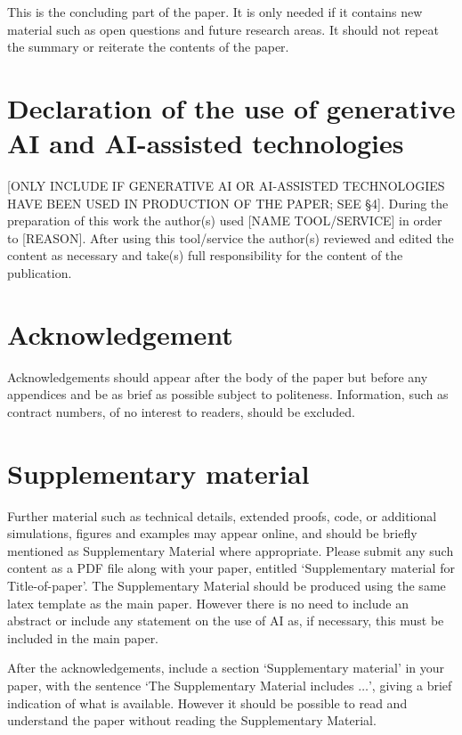 \documentclass[lineno]{biometrika}
\begin{document}
This is the concluding part of the paper.  It is only needed if it contains new material such as open questions and future research areas.
It  should not repeat the summary or reiterate the contents of the paper.


\section*{Declaration of the use of generative AI and AI-assisted technologies}

[ONLY INCLUDE IF GENERATIVE AI OR AI-ASSISTED TECHNOLOGIES HAVE BEEN USED IN PRODUCTION OF THE PAPER; SEE \S 4]. During the preparation of this work the author(s) used [NAME TOOL/SERVICE] in order to [REASON]. After using this tool/service the author(s) reviewed and edited the content as necessary and take(s) full responsibility for the content of the publication.


\section*{Acknowledgement}
Acknowledgements should appear after the body of the paper but before any appendices and be as brief as possible
subject to politeness. Information, such as contract numbers, of no interest to readers, should
be excluded.

\section*{Supplementary material}
\label{SM}
Further material such as technical details, extended proofs, code, or additional  simulations, figures and examples may appear online, and should be briefly mentioned as Supplementary Material where appropriate.  Please submit any such content as a PDF file along with your paper, entitled `Supplementary material for Title-of-paper'.  
The Supplementary Material should be produced using the same latex template as the main paper. However there is no need to include an abstract or include any statement on the use of AI as, if necessary, this must be included in the main paper.


After the acknowledgements, include a section `Supplementary material' in your paper, with the sentence `The Supplementary Material includes $\ldots$', giving a brief indication of what is available.  However it should be possible to read and understand the paper without reading the Supplementary Material.

\end{document}
